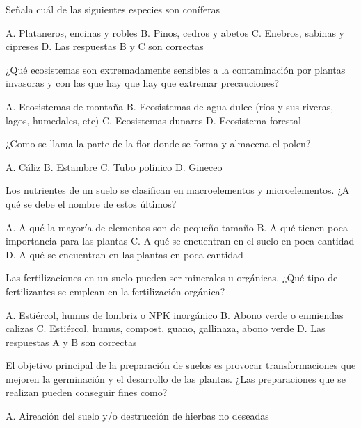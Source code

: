 \documentclass[11pt]{exam}
\begin{document}
{\begin{questions}
\question Señala cuál de las siguientes especies son coníferas
\begin{checkboxes}
  \choice A. Plataneros, encinas y robles
  \choice B. Pinos, cedros y abetos
  \choice C. Enebros, sabinas y cipreses
  \CorrectChoice D. Las respuestas B y C son correctas
\end{checkboxes}
\question ¿Qué ecosistemas son extremadamente sensibles a la contaminación por
  plantas invasoras y con las que hay que hay que extremar precauciones?
  \begin{checkboxes}
    \choice A. Ecosistemas de montaña
    \CorrectChoice B. Ecosistemas de agua dulce (ríos y sus
    riveras, lagos, humedales, etc)
    \choice C. Ecosistemas dunares
    \choice D. Ecosistema forestal
  \end{checkboxes}
\question ¿Como se llama la parte de la flor donde se forma y almacena el polen?
  \begin{checkboxes}
    \choice A. Cáliz
    \CorrectChoice B. Estambre
    \choice C. Tubo polínico
    \choice D. Gineceo
  \end{checkboxes}
\question Los nutrientes de un suelo se clasifican en macroelementos y microelementos. ¿A
  qué se debe el nombre de estos últimos?
  \begin{checkboxes}
    \choice A. A qué la mayoría de elementos son de pequeño tamaño
    \choice B. A qué tienen poca importancia para las plantas
    \choice C. A qué se encuentran en el suelo en poca cantidad
    \CorrectChoice D. A qué se encuentran en las plantas en poca cantidad 
  \end{checkboxes}
  \newpage
\question Las fertilizaciones en un suelo pueden ser minerales u orgánicas. ¿Qué tipo
  de fertilizantes se emplean en la fertilización orgánica?
  \begin{checkboxes}
    \choice A. Estiércol, humus de lombriz o NPK inorgánico
    \choice B. Abono verde  o enmiendas calizas
    \CorrectChoice C. Estiércol, humus, compost, guano, gallinaza, abono verde
    \choice D. Las respuestas A y B son correctas
  \end{checkboxes}
\question El objetivo principal de la preparación de suelos es provocar transformaciones
  que mejoren la germinación y el desarrollo de las plantas. ¿Las preparaciones que se
  realizan pueden conseguir fines como?
  \begin{checkboxes}
    \choice A. Aireación del suelo y/o destrucción de hierbas no deseadas

\end{checkboxes}
\end{questions}}
\end{document}
